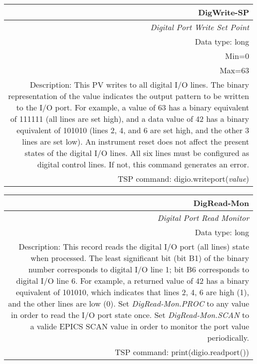 \documentclass[openany]{article}
\begin{document}
		\begin{tabular}{N}
			\hline
			\bfseries DigWrite-SP\label{pv:digwrite-sp} \\ \hline
			\emph{Digital Port Write Set Point} \\
			Data type: long \\
			Min=0 \\ 
			Max=63 \\
			Description: This PV writes to all digital I/O lines. The binary representation of the value indicates the output pattern to be written to the I/O port. For example, a value of 63 has a binary equivalent of 111111 (all lines are set high), and a data value of 42 has a binary equivalent of 101010 (lines 2, 4, and 6 are set high, and the other 3 lines are set low). An instrument reset does not affect the present states of the digital I/O lines. All six lines must be configured as digital control lines. If not, this command generates an error. \\
			TSP command: digio.writeport(\emph{value})
		\end{tabular}

		\begin{tabular}{N}
			\hline
			\bfseries DigRead-Mon\label{pv:digread-mon} \\ \hline
			\emph{Digital Port Read Monitor} \\
			Data type: long \\
			Description: This record reads the digital I/O port (all lines) state when processed. The least significant bit (bit B1) of the binary number corresponds to digital I/O line 1; bit B6 corresponds to digital I/O line 6. For example, a returned value of 42 has a binary equivalent of 101010, which indicates that lines 2, 4, 6 are high (1), and the other lines are low (0). Set \emph{DigRead-Mon.PROC} to any value in order to read the I/O port state once. Set \emph{DigRead-Mon.SCAN} to a valide EPICS SCAN value in order to monitor the port value periodically. \\
			TSP command: print(digio.readport())
		\end{tabular}
\end{document}
